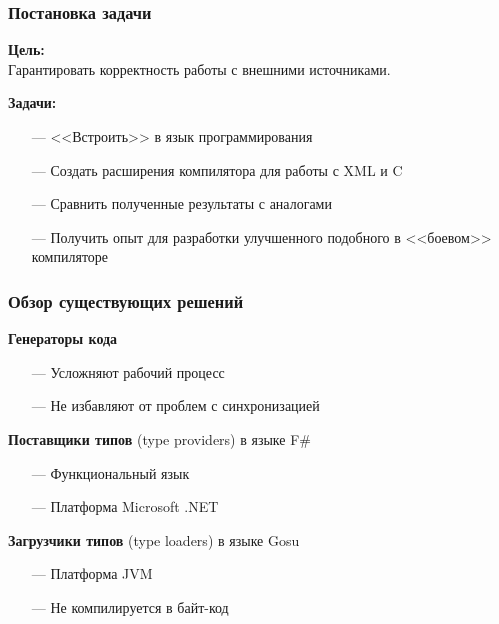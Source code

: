 \documentclass[12pt]{beamer}
\newcommand{\nl}{\vspace{\baselineskip}}
\begin{document}
\begin{frame}\frametitle{Постановка задачи}
\begin{large}
    \linespread{1}
    \textbf{Цель:}\\
    Гарантировать корректность работы с внешними источниками.

    \textbf{Задачи:}
    \begin{itemize}
        \item[---] {<<Встроить>>} в язык программирования
        \item[---] Создать расширения компилятора для работы с XML и C
        \item[---] Сравнить полученные результаты с аналогами
        \item[---] Получить опыт для разработки улучшенного подобного в {<<боевом>>} компиляторе
    \end{itemize}


    \linespread{1}
\end{large}
\end{frame}

\begin{frame}\frametitle{Обзор существующих решений} %
\begin{large}
    \textbf{Генераторы кода}
    \begin{itemize}
        \item[---] Усложняют рабочий процесс
        \item[---] Не избавляют от проблем с синхронизацией
    \end{itemize}
    \nl
    \textbf{Поставщики типов} (type providers) в языке F\#
    \begin{itemize}
        \item[---] Функциональный язык
        \item[---] Платформа Microsoft .NET
    \end{itemize}
    \nl
    \textbf{Загрузчики типов} (type loaders) в языке Gosu
    \begin{itemize}
        \item[---] Платформа JVM
        \item[---] Не компилируется в байт-код
    \end{itemize}
\end{large}
\end{frame}
\end{document}
